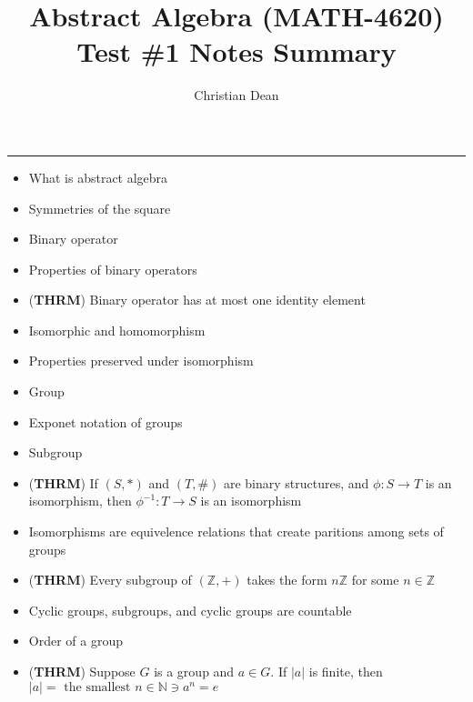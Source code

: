 \documentclass[12pt, letterpaper]{article}
\title{Abstract Algebra (MATH-4620) Test \#1 Notes Summary}
\author{Christian Dean}
\begin{document}
\maketitle

\noindent\hfil\rule{16cm}{0.4pt}\hfil
  
\begin{multicols}{2}
    \begin{itemize}
        \item What is abstract algebra
        \item Symmetries of the square
        \item Binary operator
        \item Properties of binary operators
        
        \item (\textbf{THRM}) Binary operator has at most one identity element 
        
        \item Isomorphic and homomorphism
        
        \item Properties preserved under isomorphism
        
        \item Group
        
        \item Exponet notation of groups
        
        \item Subgroup
        
        \item (\textbf{THRM}) If $(S, *)$ and $(T, \#)$ are binary structures, and $\phi: S \rightarrow T$ is
        an isomorphism, then $\phi^{-1}: T \rightarrow S$ is an isomorphism 

        \item Isomorphisms are equivelence
        relations that create paritions among sets of groups

        \item (\textbf{THRM}) Every subgroup of $(\mathbb{Z}, +)$ takes the form $n\mathbb{Z}$
        for some $n \in \mathbb{Z}$

        \item Cyclic groups, subgroups, and cyclic groups are countable
        
        \item Order of a group
        
        \item (\textbf{THRM}) Suppose $G$ is a group and $a \in G$. If $|a|$ is finite,
        then $|a| = \text{ the smallest } n \in \mathbb{N} \ni a^n = e$


\end{itemize}
\end{multicols}
\end{document}
